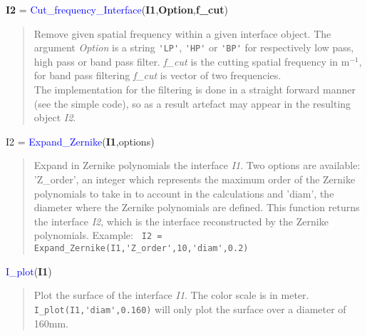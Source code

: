 \noindent \textbf{I2} = \textcolor{blue}{Cut\_frequency\_Interface}(\textbf{I1},\textbf{Option},\textbf{f\_cut})
\vspace*{-0.2cm}
\begin{quote}
Remove given spatial frequency within a given interface object. The argument \textsl{Option} is a string \verb?'LP'?, \verb?'HP'? or \verb?'BP'? for respectively low pass, high pass or band pass filter. \textsl{f\_cut} is the cutting spatial frequency in m$^{-1}$, for band pass filtering \textsl{f\_cut} is vector of two frequencies.\\
The implementation for the filtering is done in a straight forward manner (see the simple code), so as a result artefact may appear in the resulting object \textsl{I2}.
\end{quote}


\noindent I2 = \textcolor{blue}{Expand\_Zernike}(\textbf{I1},options)
\vspace*{-0.2cm}
\begin{quote}
Expand in Zernike polynomials the interface \textsl{I1}. Two options are available: 'Z\_order', an integer which represents the maximum order of the Zernike polynomials to take in to account in the calculations and 'diam', the diameter where the Zernike polynomials are defined. This function returns the interface \textsl{I2}, which is the interface reconstructed by the Zernike polynomials. Example:
\verb? I2 = Expand_Zernike(I1,'Z_order',10,'diam',0.2) ?
\end{quote}


\noindent \textcolor{blue}{I\_plot}(\textbf{I1})
\vspace*{-0.2cm}
\begin{quote}
Plot the surface of the interface \textsl{I1}. The color scale is in meter. \verb? I_plot(I1,'diam',0.160)? will only plot the surface over a diameter of 160mm.
\end{quote}


